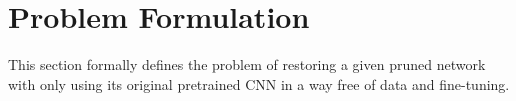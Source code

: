 \section{Problem Formulation} \label{sec:probdef}

This section formally defines the problem of restoring a given pruned network with only using its original pretrained CNN in a way free of data and fine-tuning.







